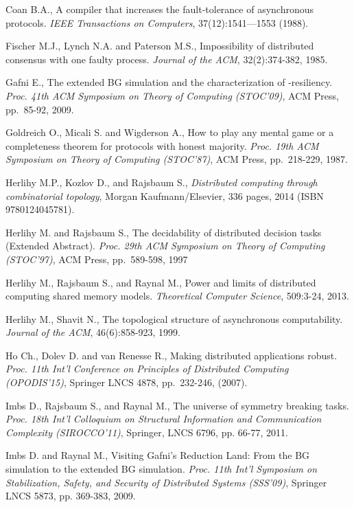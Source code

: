 \documentclass[11pt,letterpaper]{article}
\begin{document}
\begin{thebibliography}{99}
{
Coan B.A.,
A compiler that increases the fault-tolerance of asynchronous protocols. 
{\it IEEE Transactions on Computers}, 37(12):1541—1553 (1988).


Fischer M.J., Lynch N.A. and Paterson M.S.,
Impossibility of distributed consensus with one faulty process.
{\em Journal of the ACM}, 32(2):374-382, 1985.


Gafni E.,
The extended BG simulation and the characterization of -resiliency.
{\em Proc. 41th ACM  Symposium on Theory of Computing (STOC'09)},
ACM Press,  pp.~85-92,  2009.

Goldreich O., Micali S. and Wigderson A.,
How to play any mental game or a completeness theorem for 
protocols with honest majority.
{\em Proc. 19th ACM  Symposium on Theory of Computing (STOC'87)},
ACM Press,  pp.~218-229,  1987.



Herlihy M.P.,  Kozlov D., and  Rajsbaum S.,
{\it Distributed computing  through combinatorial topology},
Morgan Kaufmann/Elsevier,  336 pages,  2014
(ISBN 9780124045781).

Herlihy M. and Rajsbaum S.,
The decidability of distributed decision tasks (Extended Abstract).
{\it Proc.  29th ACM Symposium on Theory of Computing (STOC'97)},
 ACM Press, pp.~589-598, 1997


Herlihy M.,  Rajsbaum S., and Raynal M.,
 Power and limits of distributed computing shared memory models.
{\it  Theoretical  Computer  Science},  509:3-24, 2013.

Herlihy M., Shavit N.,
The topological structure of asynchronous computability.
{\it Journal of the  ACM}, 46(6):858-923, 1999.

Ho Ch.,  Dolev D. and  van Renesse R., 
Making distributed applications robust.
{\it Proc. 11th Int'l Conference on Principles of Distributed Computing
(OPODIS'15)}, Springer LNCS 4878, pp.~232-246, (2007). 

Imbs D., Rajsbaum S., and Raynal M.,
 The universe of symmetry breaking tasks.
{\it Proc.  18th Int'l Colloquium on Structural Information and
Communication Complexity (SIROCCO'11)}, Springer, LNCS 6796, pp. 66-77, 2011.



Imbs D. and Raynal M.,
Visiting Gafni's Reduction Land:
From the BG simulation to the extended BG simulation.
{\it Proc. 11th  Int'l Symposium on Stabilization, Safety, and Security
of Distributed Systems (SSS'09)}, Springer LNCS 5873, pp. 369-383, 2009.


}
\end{thebibliography}
\end{document}
